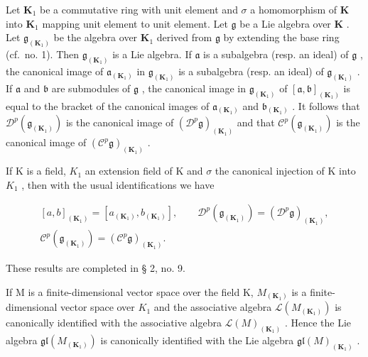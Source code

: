 Let \(\mathbf{K}_1\) be a commutative ring with unit element and \(\sigma\) a homomorphism of \(\mathbf{K}\) into \(\mathbf{K}_1\) mapping unit element to unit element. Let \(\mathfrak{g}\) be a Lie algebra over \(\mathbf{K}\) . Let \(\mathfrak{g}_{(\mathbf{K}_1)}\) be the algebra over \(\mathbf{K}_1\) derived from \(\mathfrak{g}\) by extending the base ring (cf.~no. 1). Then \(\mathfrak{g}_{(\mathbf{K}_1)}\) is a Lie algebra. If \(\mathfrak{a}\) is a subalgebra (resp. an ideal) of \(\mathfrak{g}\) , the canonical image of \(\mathfrak{a}_{(\mathbf{K}_1)}\) in \(\mathfrak{g}_{(\mathbf{K}_1)}\) is a subalgebra (resp. an ideal) of \(\mathfrak{g}_{(\mathbf{K}_1)}\) . If \(\mathfrak{a}\) and \(\mathfrak{b}\) are submodules of \(\mathfrak{g}\) , the canonical image in \(\mathfrak{g}_{(\mathbf{K}_1)}\) of \([\mathfrak{a},\mathfrak{b}]_{(\mathbf{K}_1)}\) is equal to the bracket of the canonical images of \(\mathfrak{a}_{(\mathbf{K}_1)}\) and \(\mathfrak{b}_{(\mathbf{K}_1)}\) . It follows that \(\mathcal{D}^p (\mathfrak{g}_{(\mathbf{K}_1)})\) is the canonical image of \((\mathcal{D}^p\mathfrak{g})_{(\mathbf{K}_1)}\) and that \(\mathcal{C}^p (\mathfrak{g}_{(\mathbf{K}_1)})\) is the canonical image of \((\mathcal{C}^p\mathfrak{g})_{(\mathbf{K}_1)}\) .

If K is a field, \(K_{1}\) an extension field of K and \(\sigma\) the canonical injection of K into \(K_{1}\) , then with the usual identifications we have

\[
\begin{array}{c} [ a, b ] _ {(\mathbf {K} _ {1})} = [ a _ {(\mathbf {K} _ {1})}, b _ {(\mathbf {K} _ {1})} ], \qquad \mathcal {D} ^ {p} (\mathfrak {g} _ {(\mathbf {K} _ {1})}) = (\mathcal {D} ^ {p} \mathfrak {g}) _ {(\mathbf {K} _ {1})}, \\ \mathcal {C} ^ {p} (\mathfrak {g} _ {(\mathbf {K} _ {1})}) = (\mathcal {C} ^ {p} \mathfrak {g}) _ {(\mathbf {K} _ {1})}. \end{array}
\]

These results are completed in § 2, no. 9.

If M is a finite-dimensional vector space over the field K, \(M_{(\mathbf{K}_{1})}\) is a finite-dimensional vector space over \(K_{1}\) and the associative algebra \(\mathcal{L}(M_{(\mathbf{K}_{1})})\) is canonically identified with the associative algebra \(\mathcal{L}(M)_{(\mathbf{K}_{1})}\) . Hence the Lie algebra \(\mathfrak{gl}(M_{(\mathbf{K}_{1})})\) is canonically identified with the Lie algebra \(\mathfrak{gl}(M)_{(\mathbf{K}_{1})}\) .

